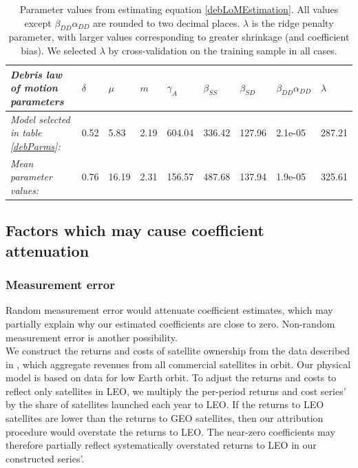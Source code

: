 \documentclass[12pt]{article}
\begin{document}
\begin{table}[H]
	\begin{tabular}{|l|l|l|l|l|l|l|l|l|}
		\hline
		\textit{Debris law of motion parameters} & \textbf{$\delta$} & \textbf{$\mu$} & \textbf{$m$} & \textbf{$\gamma_A$} & \textbf{$\beta_{SS}$} & \textbf{$\beta_{SD}$} & \textbf{$\beta_{DD}\alpha_{DD}$} & $\lambda$ \\ \hline
		\textit{Model selected in table \ref{debParms}:}                           & 0.52              & 5.83           & 2.19         & 604.04              & 336.42                & 127.96                & 2.1e-05  &    287.21                     \\ \hline
		\textit{Mean parameter values:}                           & 0.76              & 16.19           & 2.31         & 156.57              &  487.68                & 137.94                & 1.9e-05      &  325.61                  \\ \hline
	\end{tabular}
	\caption{Parameter values from estimating equation \ref{debLoMEstimation}. All values except $\beta_{DD}\alpha_{DD}$ are rounded to two decimal places. $\lambda$ is the ridge penalty parameter, with larger values corresponding to greater shrinkage (and coefficient bias). We selected $\lambda$ by cross-validation on the training sample in all cases.}
	\label{debSensitivityCoefs}
\end{table}


\subsection{Factors which may cause coefficient attenuation}
\label{attenuationFactors}
\subsubsection{Measurement error}

Random measurement error would attenuate coefficient estimates, which may partially explain why our estimated coefficients are close to zero. Non-random measurement error is another possibility. \\

We construct the returns and costs of satellite ownership from the data described in \citet{wienzierl2018}, which aggregate revenues from all commercial satellites in orbit. Our physical model is based on data for low Earth orbit. To adjust the returns and costs to reflect only satellites in LEO, we multiply the per-period returns and cost series' by the share of satellites launched each year to LEO. If the returns to LEO satellites are lower than the returns to GEO satellites, then our attribution procedure would overstate the returns to LEO. The near-zero coefficients may therefore partially reflect systematically overstated returns to LEO in our constructed series'.
\end{document}
